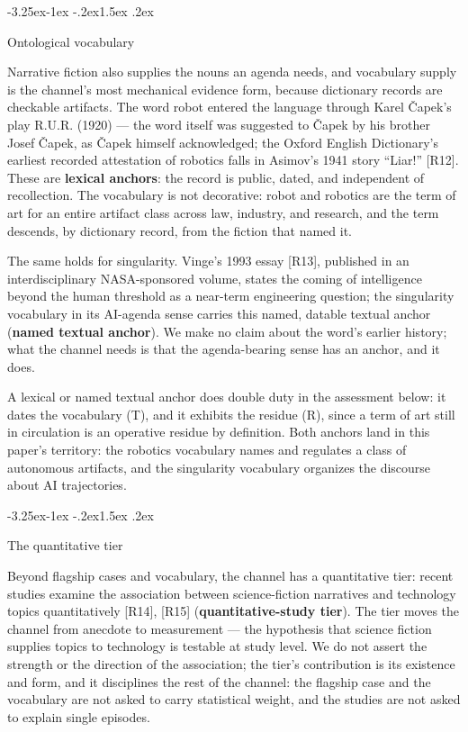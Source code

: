 \documentclass[11pt,a4paper]{article}
\makeatletter
\renewcommand\subsection{\@startsection{subsection}{2}{\z@}%
  {-3.25ex\@plus -1ex \@minus -.2ex}{1.5ex \@plus .2ex}%
  {\normalfont\large\bfseries\raggedright}}
\makeatother
\begin{document}
\subsection{Ontological vocabulary}

Narrative fiction also supplies the nouns an agenda needs, and vocabulary supply is the channel's most mechanical evidence form, because dictionary records are checkable artifacts. The word robot entered the language through Karel Čapek's play R.U.R. (1920) — the word itself was suggested to Čapek by his brother Josef Čapek, as Čapek himself acknowledged; the Oxford English Dictionary's earliest recorded attestation of robotics falls in Asimov's 1941 story ``Liar!'' [R12]. These are \textbf{lexical anchors}: the record is public, dated, and independent of recollection. The vocabulary is not decorative: robot and robotics are the term of art for an entire artifact class across law, industry, and research, and the term descends, by dictionary record, from the fiction that named it.

The same holds for singularity. Vinge's 1993 essay [R13], published in an interdisciplinary NASA-sponsored volume, states the coming of intelligence beyond the human threshold as a near-term engineering question; the singularity vocabulary in its AI-agenda sense carries this named, datable textual anchor (\textbf{named textual anchor}). We make no claim about the word's earlier history; what the channel needs is that the agenda-bearing sense has an anchor, and it does.

A lexical or named textual anchor does double duty in the assessment below: it dates the vocabulary (T), and it exhibits the residue (R), since a term of art still in circulation is an operative residue by definition. Both anchors land in this paper's territory: the robotics vocabulary names and regulates a class of autonomous artifacts, and the singularity vocabulary organizes the discourse about AI trajectories.

\subsection{The quantitative tier}

Beyond flagship cases and vocabulary, the channel has a quantitative tier: recent studies examine the association between science-fiction narratives and technology topics quantitatively [R14], [R15] (\textbf{quantitative-study tier}). The tier moves the channel from anecdote to measurement — the hypothesis that science fiction supplies topics to technology is testable at study level. We do not assert the strength or the direction of the association; the tier's contribution is its existence and form, and it disciplines the rest of the channel: the flagship case and the vocabulary are not asked to carry statistical weight, and the studies are not asked to explain single episodes.
\end{document}
